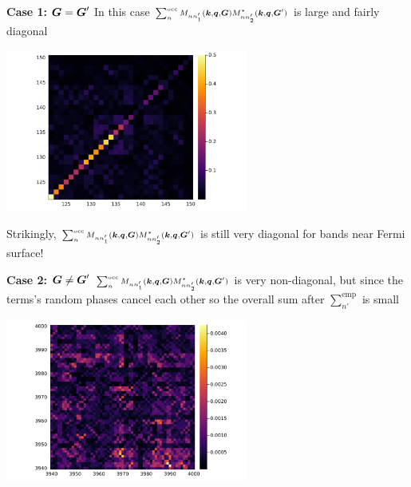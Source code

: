 \documentclass[t]{beamer}
\begin{document}
\begin{frame}[allowframebreaks]
\framebreak

\textbf{Case 1: $\vb*{G} = \vb*{G}'$}  In this case $\scriptstyle \sum_{n}^{\text{occ}} M_{n n'_1} (\vb*{k}, \vb*{q}, \vb*{G}) M^*_{nn'_2} (\vb*{k}, \vb*{q}, \vb*{G}')$ is large and fairly diagonal

\begin{center}
    \includegraphics[width=0.6\textwidth]{../data/chi/nc_range-121-150-k_idx-2-q_idx-3-G_idx-100.png}
\end{center}

Strikingly, $\scriptstyle \sum_{n}^{\text{occ}} M_{n n'_1} (\vb*{k}, \vb*{q}, \vb*{G}) M^*_{nn'_2} (\vb*{k}, \vb*{q}, \vb*{G}')$ is still very diagonal for bands near Fermi surface!

\framebreak

\textbf{Case 2: $\vb*{G} \neq \vb*{G}'$} $\scriptstyle \sum_{n}^{\text{occ}} M_{n n'_1} (\vb*{k}, \vb*{q}, \vb*{G}) M^*_{nn'_2} (\vb*{k}, \vb*{q}, \vb*{G}')$ is very non-diagonal, 
but since the terms's random phases cancel each other so the overall sum after $\sum_{n'}^{\text{emp}}$ is small

\begin{center}
    \includegraphics[width=0.6\textwidth]{../data/chi/nc_range-3939-4000-k_idx-2-q_idx-3-G1_idx-2000-G2_idx-2001.png}
\end{center}

\end{frame}
\end{document}
